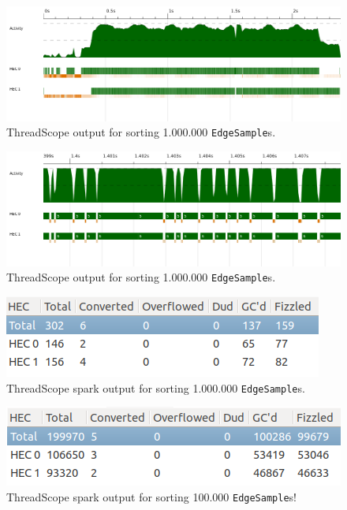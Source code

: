 \documentclass[12pt]{beamer}
\begin{document}
\begin{frame}
 \begin{figure}[h!]
  \centering
  \includegraphics[width=0.85\linewidth]{../threadscope/sorting/sorting-final}
  \caption{ThreadScope output for sorting 1.000.000 \texttt{EdgeSample}s.}
  \label{fig:sorting-thread}
\end{figure}

 \begin{figure}[h!]
  \centering
  \includegraphics[width=0.85\linewidth]{../threadscope/sorting/sorting-final-zoom}
  \caption{ThreadScope output for sorting 1.000.000 \texttt{EdgeSample}s.}
  \label{fig:sorting-thread-zoomed}
\end{figure}
\end{frame}

\begin{frame}
\begin{figure}[h!]
  \centering
  \includegraphics[width=0.6\linewidth]{../threadscope/sorting/sorting-final-sparks}
  \caption{ThreadScope spark output for sorting 1.000.000 \texttt{EdgeSample}s.}
  \label{fig:sorting-thread-sparks}
\end{figure}
 \begin{figure}[h!]
  \centering
  \includegraphics[width=0.6\linewidth]{../threadscope/sorting/sorting-100k-sparks}
  \caption{ThreadScope spark output for sorting 100.000 \texttt{EdgeSample}s!}
  \label{fig:sorting-thread-100k-sparks}
\end{figure}
\end{frame}
\end{document}
